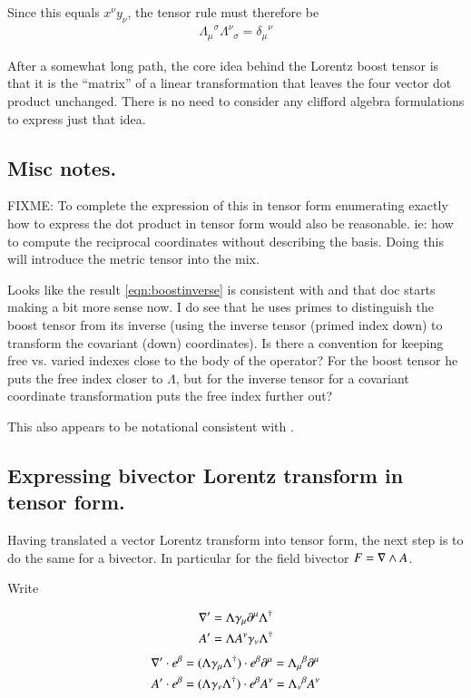 \documentclass{article}
\begin{document}
Since this equals $x^\nu y_\nu$, the tensor rule must therefore be
\begin{align}\label{eqn:boostinverse}
{\Lambda_{\mu}}^{\sigma} {\Lambda^{\nu}}_{\sigma} = {\delta_\mu}^\nu
\end{align}

After a somewhat long path, the core idea behind the Lorentz boost tensor
is that it is the ``matrix'' of a linear transformation that leaves
the four vector dot product unchanged.  There is no need to consider
any clifford algebra formulations to express just that idea.

\subsection{ Misc notes. }

FIXME: To complete
the expression of this in tensor form enumerating exactly how to express
the dot product in tensor form would also be reasonable.  ie: how to compute
the reciprocal coordinates without describing the basis.  Doing this
will introduce the metric tensor into the mix.

Looks like the result \ref{eqn:boostinverse}
is consistent with \cite{MinahanTensors} and
that doc starts making a bit more sense now.  I do see that
he uses primes to distinguish the boost tensor from its inverse (using
the inverse tensor (primed index down) to transform the covariant (down)
coordinates).  Is there a convention for keeping free vs. varied indexes
close to the body of the operator?  For the boost tensor he puts the free
index closer to $\Lambda$, but for the inverse tensor for a covariant
coordinate transformation puts the free index further out?

This also appears to be notational consistent with \cite{SpenceTensors}.

\subsection{ Expressing bivector Lorentz transform in tensor form. }

Having translated a vector Lorentz transform into tensor form, the next step is to do the same for
a bivector.  In particular for the field bivector $F = \nabla \wedge A$.

Write

\begin{align*}
\nabla' &= \Lambda \gamma_\mu \partial^\mu \Lambda^\dagger \\
A' &= \Lambda A^\nu \gamma_\nu \Lambda^\dagger \\
\end{align*}
\begin{align*}
\nabla' \cdot e^\beta &= (\Lambda \gamma_\mu \Lambda^\dagger) \cdot e^\beta \partial^\mu = {\Lambda_\mu}^\beta \partial^\mu \\
A' \cdot e^\beta &= (\Lambda \gamma_\nu \Lambda^\dagger) \cdot e^\beta A^\nu = {\Lambda_\nu}^\beta A^\nu \\
\end{align*}
\end{document}

